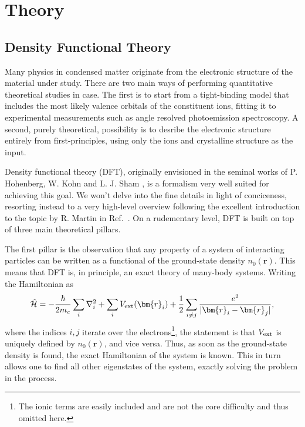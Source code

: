 \chapter{Theory}

\section{Density Functional Theory \label{sec:DFT}}
Many physics in condensed matter originate from the electronic structure of the material under study.
There are two main ways of performing quantitative theoretical studies in case.
The first is to start from a tight-binding model that includes the most likely valence orbitals of the constituent ions\cite{Slater1954}, fitting it to experimental measurements such as angle resolved photoemission spectroscopy\cite{Serebryanaya1995}.
A second, purely theoretical, possibility is to desribe the electronic structure entirely from first-principles, using only the ions and crystalline structure as the input. 

Density functional theory (DFT), originally envisioned in the seminal works of P. Hohenberg, W. Kohn and L. J. Sham \cite{Hohenberg1964,Kohn1965}, is a formalism very well suited for achieving this goal.
We won't delve into the fine details in light of conciceness, resorting instead to a very high-level overview following the excellent introduction to the topic by R. Martin in Ref.~\cite{Martin2004}.
On a rudementary level, DFT is built on top of three main theoretical pillars.

The first pillar is the observation that any property of a system of interacting particles can be written as a functional of the ground-state density $n_0(\bm{r})$.
This means that DFT is, in principle, an exact theory of many-body systems.
Writing the Hamiltonian as
\begin{equation}
	\hat{\mathcal{H}} = -\frac{\hbar}{2m_e} \sum_i \nabla_i^2 + \sum_i V_{\rm ext}(\bm{r}_i) + \frac{1}{2}\sum_{i\neq j} \frac{e^2}{|\bm{r}_i - \bm{r}_j|},
\end{equation}
where the indices $i,j$ iterate over the electrons\footnote{The ionic terms are easily included and are not the core difficulty and thus omitted here.}, the statement is that $V_{\rm ext}$ is uniquely defined by $n_0(\bm{r})$, and vice versa.
Thus, as soon as the ground-state density is found, the exact Hamiltonian of the system is known.
This in turn allows one to find all other eigenstates of the system, exactly solving the problem in the process.

